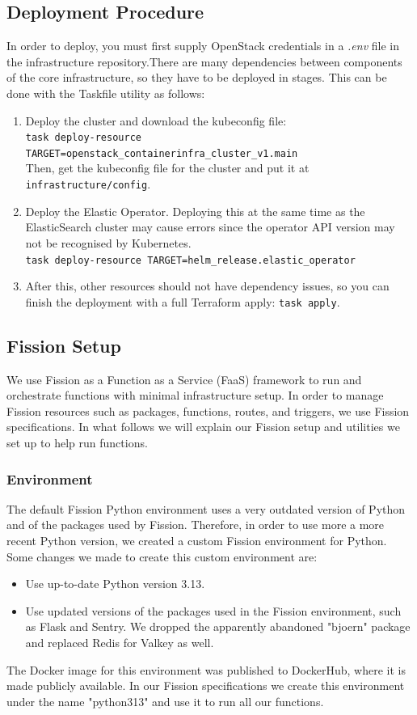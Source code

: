 \subsection{Deployment Procedure}
In order to deploy, you must first supply OpenStack credentials in a \textit{.env} file in the infrastructure repository.There are many dependencies between components of the core infrastructure, so they have to be deployed in stages. This can be done with the Taskfile utility as follows:
\begin{enumerate}
	\item Deploy the cluster and download the kubeconfig file: \\
	\texttt{task deploy-resource TARGET=openstack\_containerinfra\_cluster\_v1.main}\\
	Then, get the kubeconfig file for  the cluster and put it at \texttt{infrastructure/config}.
	
	\item Deploy the Elastic Operator. Deploying this at the same time as the ElasticSearch cluster may cause errors since the operator API version may not be recognised by Kubernetes.\\
	\texttt{task deploy-resource TARGET=helm\_release.elastic\_operator}
	
	\item After this, other resources should not have dependency issues, so you can finish the deployment with a full Terraform apply: \texttt{task apply}.
\end{enumerate}


\subsection{Fission Setup}
We use Fission as a Function as a Service (FaaS) framework to run and orchestrate functions with minimal infrastructure setup. In order to manage Fission resources such as packages, functions, routes, and triggers, we use Fission specifications. In what follows we will explain our Fission setup and utilities we set up to help run functions.

\subsubsection{Environment}
The default Fission Python environment uses a very outdated version of Python and of the packages used by Fission. Therefore, in order to use more a more recent Python version, we created a custom Fission environment for Python. Some changes we made to create this custom environment are:
\begin{itemize}
	\item Use up-to-date Python version 3.13.
	
	\item Use updated versions of the packages used in the Fission environment, such as Flask and Sentry.  We dropped the apparently abandoned "bjoern" package and replaced Redis for Valkey as well.
\end{itemize}
The Docker image for this environment was published to DockerHub, where it is made publicly available. In our Fission specifications we create this environment under the name "python313" and use it to run all our functions.